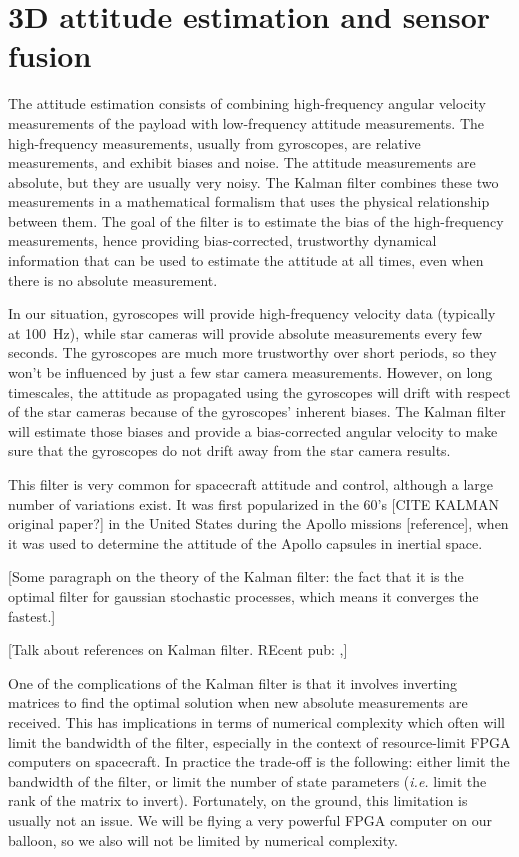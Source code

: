 \section{3D attitude estimation and sensor fusion}
\label{sec:KalmanFilter}
\renewcommand*{\arraystretch}{0.75}


The attitude estimation consists of combining high-frequency angular velocity measurements of the payload with low-frequency attitude measurements. The high-frequency measurements, usually from gyroscopes, are relative measurements, and exhibit biases and noise. The attitude measurements are absolute, but they are usually very noisy. The Kalman filter combines these two measurements in a mathematical formalism that uses the physical relationship between them. The goal of the filter is to estimate the bias of the high-frequency measurements, hence providing bias-corrected, trustworthy dynamical information that can be used to estimate the attitude at all times, even when there is no absolute measurement.

In our situation, gyroscopes will provide high-frequency velocity data (typically at 100~Hz), while star cameras will provide absolute measurements every few seconds. The gyroscopes are much more trustworthy over short periods, so they won't be influenced by just a few star camera measurements. However, on long timescales, the attitude as propagated using the gyroscopes will drift with respect of the star cameras because of the gyroscopes' inherent biases. The Kalman filter will estimate those biases and provide a bias-corrected angular velocity to make sure that the gyroscopes do not drift away from the star camera results.

This filter is very common for spacecraft attitude and control, although a large number of variations exist. It was first popularized in the 60's [CITE KALMAN original paper?] in the United States during the Apollo missions [reference], when it was used to determine the attitude of the Apollo capsules in inertial space. 

[Some paragraph on the theory of the Kalman filter: the fact that it is the optimal filter for gaussian stochastic processes, which means it converges the fastest.]

[Talk about references on Kalman filter. REcent pub: \citep{Crassidis:2011ud},\citep{Markley:2014dn}]

One of the complications of the Kalman filter is that it involves inverting matrices to find the optimal solution when new absolute measurements are received. This has implications in terms of numerical complexity which often will limit the bandwidth of the filter, especially in the context of resource-limit FPGA computers on spacecraft. In practice the trade-off is the following: either limit the bandwidth of the filter, or limit the number of state parameters (\textit{i.e.} limit the rank of the matrix to invert). Fortunately, on the ground, this limitation is usually not an issue. We will be flying a very powerful FPGA computer on our balloon, so we also will not be limited by numerical complexity.

